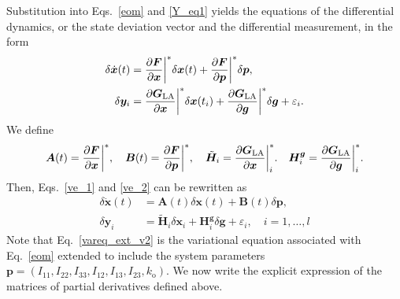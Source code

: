 \documentclass[pdflatex,sn-mathphys-num]{sn-jnl}%
\theoremstyle{thmstyleone}%
\theoremstyle{thmstyletwo}%
\theoremstyle{thmstylethree}%
\renewcommand{\vec}[1]{\boldsymbol{#1}}
\begin{document}
%
Substitution into Eqs.~\eqref{eom} and \eqref{Y_eq1} yields the equations of the differential dynamics, or the state deviation vector and the differential measurement, in the form
\begin{align}\label{ve_1}
	\delta\dot{\vec{x}}(t) &= \pdv{\vec{F}}{\vec{x}}\bigg|^* \delta \vec{x}(t) + \pdv{\vec{F}}{\vec{p}}\bigg|^* \delta \vec{p}, \\
	\label{ve_2}
	\delta \vec{y}_i &= \pdv{\vec{G}_{\mathrm{LA}}}{\vec{x}} \bigg|^*\delta \vec{x}(t_i) + \pdv{\vec{G}_{\mathrm{LA}}}{\vec{g}}\bigg|^* \delta \vec{g} 
	+ \varepsilon_i.
\end{align}
%
We define
\begin{align}
\vec{A}(t) = \pdv{\vec{F}}{\vec{x}}\bigg|^*, \quad 
\vec{B}(t) = \pdv{\vec{F}}{\vec{p}}\bigg|^*, \quad 
\tilde{\vec{H}}_i = \pdv{\vec{G}_{\mathrm{LA}}}{\vec{x}}\bigg|^*_i.
\quad 
\vec{H}^{\vec{g}}_i = \pdv{\vec{G}_{\mathrm{LA}}}{\vec{g}}\bigg|^*_i.
\end{align}
Then, Eqs.~\eqref{ve_1} and  \eqref{ve_2} can be rewritten as
\begin{align}\label{vareq_ext_v2}
	\delta \dot{\vec{x}}(t) &= \vec{A}(t) \delta \vec{x}(t) + \vec{B}(t) \delta \vec{p},
	\\
	\delta \vec{y}_i &= \tilde{\vec{H}}_i \delta \vec{x}_i 
	+ \vec{H}^{\vec{g}}_i \delta \vec{g}
	+ \varepsilon_i,
	\quad i = 1, \dots, l
\end{align}
%
Note that Eq.~\eqref{vareq_ext_v2} is the variational equation associated with Eq.~\eqref{eom} extended to include the system parameters $\vec{p} = (I_{11}, I_{22}, I_{33}, I_{12}, I_{13}, I_{23}, k_\mathrm{o})$.
We now write the explicit expression of the matrices of partial derivatives defined above.
\end{document}
